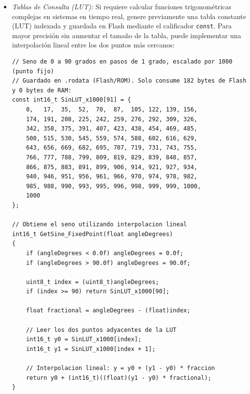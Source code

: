 \documentclass[
10pt, %
a4paper, %
oneside, %
headinclude,footinclude, %
BCOR5mm, %
]{scrartcl}
\begin{document}
\begin{enumerate}
\begin{itemize}
\begin{lstlisting}[style=CMakeStyle]
// CORRECTO: Resuelto en un solo ciclo de reloj por la CPU mediante hardware de barrido
double lux = 0.01 * (double)(1 << exponente) * (double)mantisa;
		\end{lstlisting}
		\item \textit{Tablas de Consulta (LUT):} Si requiere calcular funciones trigonométricas complejas en sistemas en tiempo real, genere previamente una tabla constante (LUT) indexada y guardada en Flash mediante el calificador \texttt{const}. Para mayor precisión sin aumentar el tamaño de la tabla, puede implementar una interpolación lineal entre los dos puntos más cercanos:
		\begin{lstlisting}[style=CMakeStyle]
// Seno de 0 a 90 grados en pasos de 1 grado, escalado por 1000 (punto fijo)
// Guardado en .rodata (Flash/ROM). Solo consume 182 bytes de Flash y 0 bytes de RAM:
const int16_t SinLUT_x1000[91] = {
    0,   17,  35,  52,  70,  87,  105, 122, 139, 156,
    174, 191, 208, 225, 242, 259, 276, 292, 309, 326,
    342, 358, 375, 391, 407, 423, 438, 454, 469, 485,
    500, 515, 530, 545, 559, 574, 588, 602, 616, 629,
    643, 656, 669, 682, 695, 707, 719, 731, 743, 755,
    766, 777, 788, 799, 809, 819, 829, 839, 848, 857,
    866, 875, 883, 891, 899, 906, 914, 921, 927, 934,
    940, 946, 951, 956, 961, 966, 970, 974, 978, 982,
    985, 988, 990, 993, 995, 996, 998, 999, 999, 1000,
    1000
};

// Obtiene el seno utilizando interpolacion lineal
int16_t GetSine_FixedPoint(float angleDegrees)
{
    if (angleDegrees < 0.0f) angleDegrees = 0.0f;
    if (angleDegrees > 90.0f) angleDegrees = 90.0f;

    uint8_t index = (uint8_t)angleDegrees;
    if (index >= 90) return SinLUT_x1000[90];

    float fractional = angleDegrees - (float)index;

    // Leer los dos puntos adyacentes de la LUT
    int16_t y0 = SinLUT_x1000[index];
    int16_t y1 = SinLUT_x1000[index + 1];

    // Interpolacion lineal: y = y0 + (y1 - y0) * fraccion
    return y0 + (int16_t)((float)(y1 - y0) * fractional);
}
		\end{lstlisting}
		

\end{itemize}
\end{enumerate}
\end{document}
